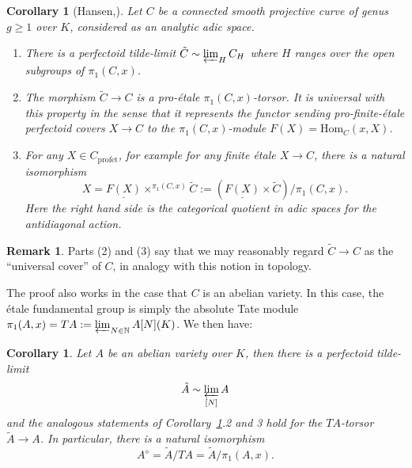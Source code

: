 \documentclass[10pt,oneside]{amsart}
\newtheorem{corollary}[theorem]{Corollary}
\theoremstyle{definition}
\newtheorem{remark}[theorem]{Remark}
\newcommand{\N}{\mathbb{N}}
\begin{document}
	\begin{corollary}[Hansen,\cite{Hansen-blog}]\label{c:universal-covers-of-curves}
		Let $C$ be a connected smooth projective curve of genus $g\geq 1$ over $K$, considered as an analytic adic space.
		\begin{enumerate}
		\item There is a perfectoid tilde-limit $\tilde{C} \sim \varprojlim_{H}C_H$ where $H$ ranges over the open subgroups of $ \pi_1(C,x)$. 
		\item The morphism $\tilde{C}\to C$ is a pro-\'etale $\pi_1(C,x)$-torsor. It is universal with this property in the sense that it represents the functor sending	 pro-finite-\'etale perfectoid covers $X\to C$ to the $\pi_1(C,x)$-module $F(X)=\mathrm{Hom}_C(x,X)$.
		\item For any $X\in C_{\mathrm{prof\acute{e}t}}$, for example for any finite \'etale $X\to C$, there is a natural isomorphism
		\[ X = \underline{F(X)}\times^{\pi_1(C,x)}\tilde{C}:=(\underline{F(X)}\times \tilde{C})/\pi_1(C,x).\]
		Here the right hand side is the categorical quotient in adic spaces for the antidiagonal action.
	\end{enumerate}
	\end{corollary}
\begin{remark}
Parts (2) and (3) say that we may reasonably regard $\tilde{C}\to C$ as the ``universal cover'' of $C$, in analogy with this notion in topology.
\end{remark}
The proof also works in the case that $C$ is an abelian variety. In this case, the \'etale fundamental group is simply the absolute Tate module  $\pi_1(A,x)=TA:=\varprojlim_{N\in \N} A[N](K)$. We then have:
\begin{corollary}\label{c:universal-covers-of-abelian-varieties}
	Let $A$ be an abelian variety over $K$, then there is a perfectoid tilde-limit \[\tilde{A}\sim \varprojlim_{[N]}A\]
	and the analogous statements of Corollary~\ref{c:universal-covers-of-curves}.2 and 3 hold for the $TA$-torsor $\tilde{A}\to A$. In particular, there is a natural isomorphism
	\[A^{\diamond}=\tilde{A}/TA =\tilde{A}/\pi_1(A,x).\]
\end{corollary}
\end{document}
